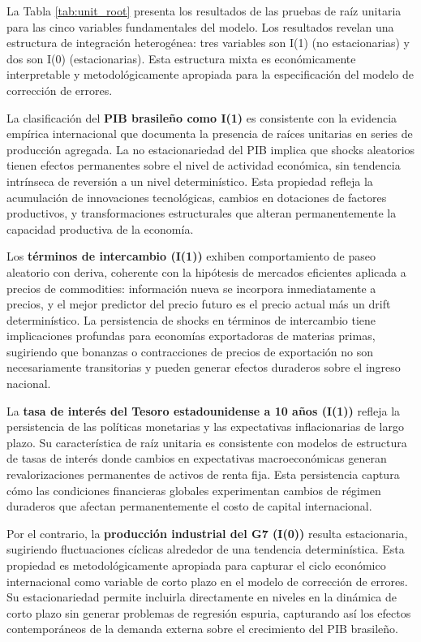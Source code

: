 \documentclass[3p,11pt,draft,natbib=false]{elsarticle}
\begin{document}
La Tabla \ref{tab:unit_root} presenta los resultados de las pruebas de raíz unitaria para las cinco variables fundamentales del modelo. Los resultados revelan una estructura de integración heterogénea: tres variables son I(1) (no estacionarias) y dos son I(0) (estacionarias). Esta estructura mixta es económicamente interpretable y metodológicamente apropiada para la especificación del modelo de corrección de errores.

La clasificación del \textbf{PIB brasileño como I(1)} es consistente con la evidencia empírica internacional que documenta la presencia de raíces unitarias en series de producción agregada. La no estacionariedad del PIB implica que shocks aleatorios tienen efectos permanentes sobre el nivel de actividad económica, sin tendencia intrínseca de reversión a un nivel determinístico. Esta propiedad refleja la acumulación de innovaciones tecnológicas, cambios en dotaciones de factores productivos, y transformaciones estructurales que alteran permanentemente la capacidad productiva de la economía.

Los \textbf{términos de intercambio (I(1))} exhiben comportamiento de paseo aleatorio con deriva, coherente con la hipótesis de mercados eficientes aplicada a precios de commodities: información nueva se incorpora inmediatamente a precios, y el mejor predictor del precio futuro es el precio actual más un drift determinístico. La persistencia de shocks en términos de intercambio tiene implicaciones profundas para economías exportadoras de materias primas, sugiriendo que bonanzas o contracciones de precios de exportación no son necesariamente transitorias y pueden generar efectos duraderos sobre el ingreso nacional.

La \textbf{tasa de interés del Tesoro estadounidense a 10 años (I(1))} refleja la persistencia de las políticas monetarias y las expectativas inflacionarias de largo plazo. Su característica de raíz unitaria es consistente con modelos de estructura de tasas de interés donde cambios en expectativas macroeconómicas generan revalorizaciones permanentes de activos de renta fija. Esta persistencia captura cómo las condiciones financieras globales experimentan cambios de régimen duraderos que afectan permanentemente el costo de capital internacional.

Por el contrario, la \textbf{producción industrial del G7 (I(0))} resulta estacionaria, sugiriendo fluctuaciones cíclicas alrededor de una tendencia determinística. Esta propiedad es metodológicamente apropiada para capturar el ciclo económico internacional como variable de corto plazo en el modelo de corrección de errores. Su estacionariedad permite incluirla directamente en niveles en la dinámica de corto plazo sin generar problemas de regresión espuria, capturando así los efectos contemporáneos de la demanda externa sobre el crecimiento del PIB brasileño.
\end{document}

